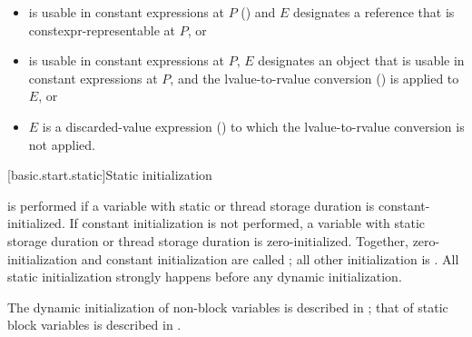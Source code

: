 \documentclass{wg21}
\begin{document}
\begin{addedblock}
\begin{itemize}
\item
{} is usable in constant expressions at $P$ () and $E$ designates a reference that is constexpr-representable at $P$, or
\item
{} is usable in constant expressions at $P$, $E$ designates an object that is usable in constant expressions at $P$, and the lvalue-to-rvalue
conversion () is applied to $E$, or
\item
$E$ is a discarded-value expression () to which the lvalue-to-rvalue
conversion is not applied.
\end{itemize}
\end{addedblock}

[basic.start.static]{Static initialization}



\pnum
{}%
 is performed
if a variable  with static or thread storage duration
is constant-initialized.
%
If constant initialization is not performed, a variable with static
storage duration or thread storage
duration is zero-initialized.
Together, zero-initialization and constant initialization are called
;
all other initialization is .
All static initialization strongly happens before
any dynamic initialization.
\begin{note}
    The dynamic initialization of non-block variables is described
    in ; that of static block variables is described
    in .
\end{note}
\end{document}
